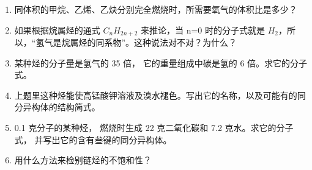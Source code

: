 \begin{enumerate}
\item
  同体积的甲烷、乙烯、乙炔分别完全燃烧时，所需要氧气的体积比是多少？
\item
  如果根据烷属烃的通式 \(C_{n}H_{2n+2}\) 来推论，当 n=0 时的分子式就是
  \(H_{2}\)，所以，``氢气是烷属烃的同系物''。这种说法对不对？为什么？
\item
  某种烃的分子量是氢气的 35 倍， 它的重量组成中碳是氢的 6
  倍。求它的分子式。
\item
  上题里这种烃能使高锰酸钾溶液及溴水褪色。写出它的名称，以及可能有的同分异构体的结构简式。
\item
  0.1 克分子的某种烃， 燃烧时生成 22 克二氧化碳和 7.2
  克水。求它的分子式， 并写出它的含有叁键的同分异构体。
\item
  用什么方法来检别链烃的不饱和性？
\end{enumerate}

